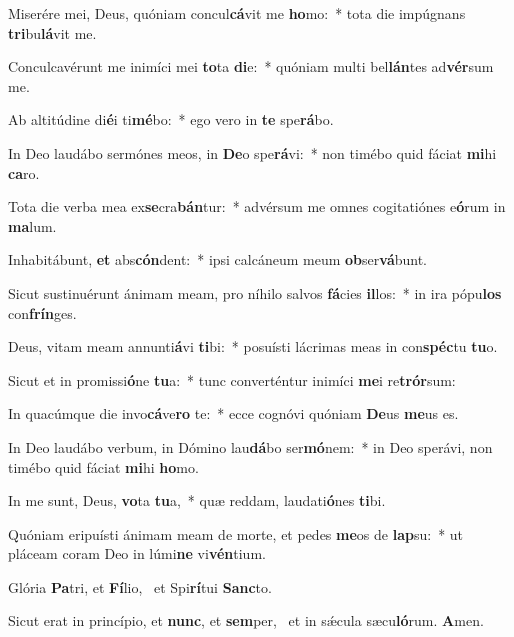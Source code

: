 \item Miserére mei, Deus, quóniam concul\textbf{cá}vit me \textbf{ho}mo:~* tota die impúgnans \textbf{tri}bu\textbf{lá}vit me.
\item Conculcavérunt me inimíci mei \textbf{to}ta \textbf{di}e:~* quóniam multi bel\textbf{lán}tes ad\textbf{vér}sum me.
\item Ab altitúdine di\textbf{é}i ti\textbf{mé}bo:~* ego vero in \textbf{te} spe\textbf{rá}bo.
\item In Deo laudábo sermónes meos, in \textbf{De}o spe\textbf{rá}vi:~* non timébo quid fáciat \textbf{mi}hi \textbf{ca}ro.
\item Tota die verba mea ex\textbf{se}cra\textbf{bán}tur:~* advérsum me omnes cogitatiónes e\textbf{ó}rum in \textbf{ma}lum.
\item Inhabitábunt, \textbf{et} abs\textbf{cón}\-dent:~* ipsi calcáneum meum \textbf{ob}ser\textbf{vá}bunt.
\item Sicut sustinuérunt ánimam meam, pro níhilo salvos \textbf{fá}cies \textbf{il}los:~* in ira pópu\textbf{los} con\textbf{frín}ges.
\item Deus, vitam meam annunti\textbf{á}vi \textbf{ti}bi:~* posuísti lácrimas meas in con\textbf{spéc}tu \textbf{tu}o.
\item Sicut et in promissi\textbf{ó}ne \textbf{tu}a:~* tunc converténtur inimíci \textbf{me}i re\textbf{trór}sum:
\item In quacúmque die invo\textbf{cá}ve\textbf{ro} te:~* ecce cognóvi quóniam \textbf{De}us \textbf{me}us es.
\item In Deo laudábo verbum, in Dómino lau\textbf{dá}bo ser\textbf{mó}nem:~* in Deo sperávi, non timébo quid fáciat \textbf{mi}hi \textbf{ho}mo.
\item In me sunt, Deus, \textbf{vo}ta \textbf{tu}a,~* quæ reddam, laudati\textbf{ó}nes \textbf{ti}bi.
\item Quóniam eripuísti ánimam meam de morte, et pedes \textbf{me}os de \textbf{lap}su:~* ut pláceam coram Deo in lúmi\textbf{ne} vi\textbf{vén}tium.
\item Glória \textbf{Pa}tri, et \textbf{Fí}lio,~\psstar{} et Spi\textbf{rí}tui \textbf{Sanc}to.
\item Sicut erat in princípio, et \textbf{nunc}, et \textbf{sem}per,~\psstar{} et in sǽcula sæcu\textbf{ló}rum. \textbf{A}men.
